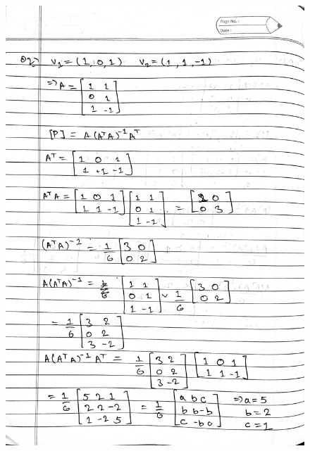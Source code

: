 \documentclass[12pt]{article}
\begin{document}
 \begin{figure}[h] %
 \centering
 \includegraphics[scale=0.15]{2022-04-29 21-37-46 - ALA DA - p3.jpg}
 \end{figure}
\end{document}
